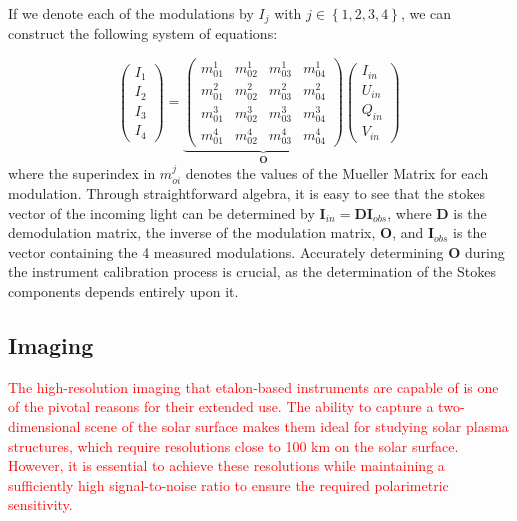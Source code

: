 If we denote each of the modulations by $I _ j$ with $j \in \left\{ 1, 2, 3, 4\right\}$, we can construct the following system of equations:

\begin{equation}
  \begin{pmatrix}
  I _ 1 \\
  I _ 2 \\
  I _ 3 \\
  I _ 4
  \end{pmatrix} = 
  \underbrace{\begin{pmatrix} 
      m ^ 1 _ {01} & m ^ 1 _ {02} & m ^ 1 _ {03} & m ^ 1 _ {04} \\ 
      m ^ 2 _ {01} & m ^ 2 _ {02} & m ^ 2 _ {03} & m ^ 2 _ {04} \\
      m ^ 3 _ {01} & m ^ 3 _ {02} & m ^ 3 _ {03} & m ^ 3 _ {04} \\
      m ^ 4 _ {01} & m ^ 4 _ {02} & m ^ 4 _ {03} & m ^ 4 _ {04} 
  \end{pmatrix}}_ {\textbf{O}}
  \begin{pmatrix}
    I _ {in} \\
    U _ {in} \\
    Q _ {in} \\
    V _ {in}
    \end{pmatrix} \, 
    \label{eq_spectro_theory: stokes_linear_comb}
\end{equation}
where the superindex in $m ^j _{oi}$ denotes the values of the Mueller Matrix for each modulation. Through straightforward algebra, it is easy to see that the stokes vector of the incoming light can be determined by $\textbf{I}_{in} = \textbf{D}\textbf{I}_{obs}$, where $\textbf{D}$ is the demodulation matrix, the inverse of the modulation matrix, $\textbf{O}$, and $\textbf{I}_{obs}$ is the vector containing the 4 measured modulations. Accurately determining $\textbf{O}$ during the instrument calibration process is crucial, as the determination of the Stokes components depends entirely upon it.

\subsection{\label{susec_spectropolarimeters: Imaging}Imaging}

\textcolor{red}{The high-resolution imaging that etalon-based instruments are capable of is one of the pivotal reasons for their extended use. The ability to capture a two-dimensional scene of the solar surface makes them ideal for studying solar plasma structures, which require resolutions close to 100 km on the solar surface. However, it is essential to achieve these resolutions while maintaining a sufficiently high signal-to-noise ratio to ensure the required polarimetric sensitivity.}

